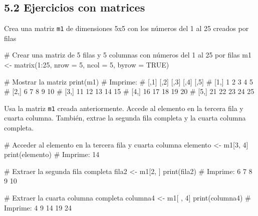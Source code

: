 \documentclass[
  letterpaper,
  DIV=11,
  numbers=noendperiod]{scrreprt}
\newenvironment{Shaded}{\begin{snugshade}}{\end{snugshade}}
\newcommand{\AttributeTok}[1]{\textcolor[rgb]{0.40,0.45,0.13}{#1}}
\newcommand{\CommentTok}[1]{\textcolor[rgb]{0.37,0.37,0.37}{#1}}
\newcommand{\ConstantTok}[1]{\textcolor[rgb]{0.56,0.35,0.01}{#1}}
\newcommand{\DecValTok}[1]{\textcolor[rgb]{0.68,0.00,0.00}{#1}}
\newcommand{\FunctionTok}[1]{\textcolor[rgb]{0.28,0.35,0.67}{#1}}
\newcommand{\NormalTok}[1]{\textcolor[rgb]{0.00,0.23,0.31}{#1}}
\newcommand{\OtherTok}[1]{\textcolor[rgb]{0.00,0.23,0.31}{#1}}
\newcommand{\SpecialCharTok}[1]{\textcolor[rgb]{0.37,0.37,0.37}{#1}}
\begin{document}
\hypertarget{ejercicios-con-matrices}{%
\subsection{5.2 Ejercicios con matrices}\label{ejercicios-con-matrices}}

Crea una matriz \texttt{m1} de dimensiones 5x5 con los números del 1 al
25 creados por filas

\begin{Shaded}
\begin{Highlighting}[]
\CommentTok{\# Crear una matriz de 5 filas y 5 columnas con números del 1 al 25 por filas}
\NormalTok{m1 }\OtherTok{\textless{}{-}} \FunctionTok{matrix}\NormalTok{(}\DecValTok{1}\SpecialCharTok{:}\DecValTok{25}\NormalTok{, }\AttributeTok{nrow =} \DecValTok{5}\NormalTok{, }\AttributeTok{ncol =} \DecValTok{5}\NormalTok{, }\AttributeTok{byrow =} \ConstantTok{TRUE}\NormalTok{)}

\CommentTok{\# Mostrar la matriz}
\FunctionTok{print}\NormalTok{(m1)}
\CommentTok{\# Imprime:}
\CommentTok{\#      [,1] [,2] [,3] [,4] [,5]}
\CommentTok{\# [1,]    1    2    3    4    5}
\CommentTok{\# [2,]    6    7    8    9   10}
\CommentTok{\# [3,]   11   12   13   14   15}
\CommentTok{\# [4,]   16   17   18   19   20}
\CommentTok{\# [5,]   21   22   23   24   25}
\end{Highlighting}
\end{Shaded}

Usa la matriz \texttt{m1} creada anteriormente. Accede al elemento en la
tercera fila y cuarta columna. También, extrae la segunda fila completa
y la cuarta columna completa.

\begin{Shaded}
\begin{Highlighting}[]
\CommentTok{\# Acceder al elemento en la tercera fila y cuarta columna}
\NormalTok{elemento }\OtherTok{\textless{}{-}}\NormalTok{ m1[}\DecValTok{3}\NormalTok{, }\DecValTok{4}\NormalTok{]}
\FunctionTok{print}\NormalTok{(elemento)}
\CommentTok{\# Imprime: 14}

\CommentTok{\# Extraer la segunda fila completa}
\NormalTok{fila2 }\OtherTok{\textless{}{-}}\NormalTok{ m1[}\DecValTok{2}\NormalTok{, ]}
\FunctionTok{print}\NormalTok{(fila2)}
\CommentTok{\# Imprime: 6 7 8 9 10}

\CommentTok{\# Extraer la cuarta columna completa}
\NormalTok{columna4 }\OtherTok{\textless{}{-}}\NormalTok{ m1[ , }\DecValTok{4}\NormalTok{]}
\FunctionTok{print}\NormalTok{(columna4)}
\CommentTok{\# Imprime: 4 9 14 19 24}
\end{Highlighting}
\end{Shaded}
\end{document}
